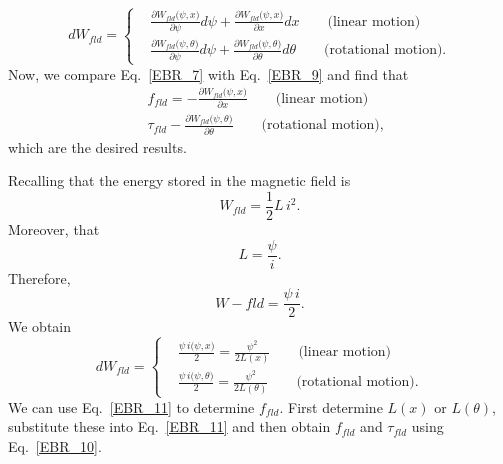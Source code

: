 \documentclass[11pt,a4paper,oneside]{book}
\numberwithin{equation}{section}
\theoremstyle{it}
\theoremstyle{definition}
\begin{document}
\begin{equation}\label{EBR_9}
	dW_{fld}  = \left\{
	\begin{aligned}
		&\frac{\partial W_{fld}\big(\psi,x\big)}{\partial\psi}d\psi +  \frac{\partial W_{fld}\big(\psi,x\big)}{\partial x}dx \qquad \text{(linear motion)} \\[8pt]
		&\frac{\partial W_{fld}\big(\psi,\theta\big)}{\partial\psi}d\psi +  \frac{\partial W_{fld}\big(\psi,\theta\big)}{\partial \theta}d\theta \qquad \text{(rotational motion).} 
	\end{aligned}\right.
\end{equation} 
Now, we compare Eq.~\eqref{EBR_7} with Eq.~\eqref{EBR_9} and find that 
\begin{equation}\label{EBR_10}
	\boxed{\begin{aligned}
		&f_{fld} = - \frac{\partial W_{fld}\big(\psi,x\big)}{\partial x} \qquad \text{(linear motion)} \\[8pt]
		&\tau_{fld} - \frac{\partial W_{fld}\big(\psi,\theta\big)}{\partial \theta} \qquad \text{(rotational motion),} 
	\end{aligned}}
\end{equation} 
which are the desired results.

Recalling that the energy stored in the magnetic field is $$ W_{fld} = \frac{1}{2}L\,i^2.$$ Moreover, that $$ L=\frac{\psi}{i}.$$ Therefore, $$ W-{fld}=\frac{\psi\,i}{2}.$$ We obtain
\begin{equation}\label{EBR_11}
	\boxed{dW_{fld}  = \left\{
	\begin{aligned}
		&\frac{\psi\,i\big(\psi,x\big)}{2} =  \frac{\psi^2}{2L(x)} \qquad \text{(linear motion)} \\[8pt]
		&\frac{\psi\,i\big(\psi,\theta\big)}{2} =  \frac{\psi^2}{2L(\theta)} \qquad \text{(rotational motion).} 
	\end{aligned}\right.}
\end{equation} 
We can use Eq.~\eqref{EBR_11} to determine $f_{fld}$. First determine $L(x)$ or $L(\theta)$, substitute these into Eq.~\eqref{EBR_11} and then obtain $f_{fld}$ and $\tau_{fld}$ using Eq.~\eqref{EBR_10}. 
\end{document}
